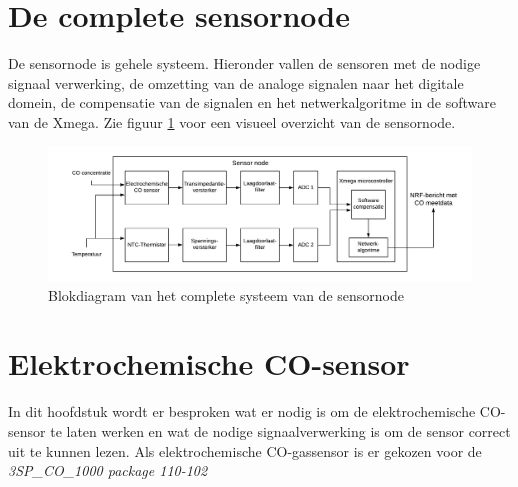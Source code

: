 \documentclass[a4paper, 11pt]{article} %
\begin{document}
	\section{De complete sensornode} \label{sec::sensornode}
	De sensornode is gehele systeem. Hieronder vallen de sensoren met de nodige signaal verwerking, de omzetting van de analoge signalen naar het digitale domein, de compensatie van de signalen en het netwerkalgoritme in de software van de Xmega. Zie figuur \ref{fig::sensorNode_dia} voor een visueel overzicht van de sensornode.
	\begin{figure}[h!]
		\centering
		\hspace*{-4cm} 
		\includegraphics[width=1.7\linewidth]{../Media/sensorNode_dia.png}
		\caption{Blokdiagram van het complete systeem van de sensornode}
		\label{fig::sensorNode_dia}
	\end{figure}
	\newpage
	\section{Elektrochemische CO-sensor }
	In dit hoofdstuk wordt er besproken wat er nodig is om de elektrochemische CO-sensor te laten werken en wat de nodige signaalverwerking is om de sensor correct uit te kunnen lezen. Als elektrochemische CO-gassensor is er gekozen voor de \textit{3SP\_CO\_1000 package 110-102}
	\newpage
	
\end{document}

